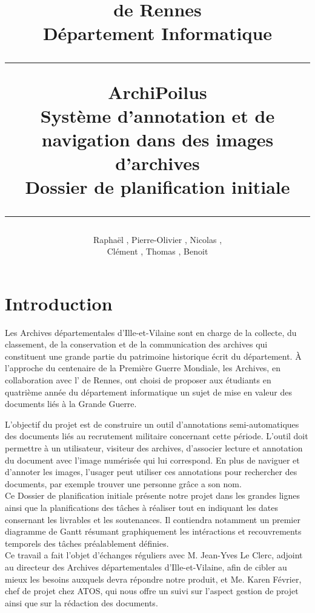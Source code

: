 \documentclass[a4paper]{article}
\title{\bsc{INSA} de Rennes \\ Département Informatique \\ \bigskip \hrule \bigskip ArchiPoilus \\ \bigskip Système d'annotation et de navigation dans des images d'archives \\ \bigskip Dossier de planification initiale \bigskip \hrule}
\author{Raphaël \bsc{Baron}, Pierre-Olivier \bsc{Bouteau}, Nicolas \bsc{Charpentier}, \\ Clément \bsc{Leboullenger}, Thomas \bsc{François}, Benoit \bsc{Travers}}
\begin{document}
\maketitle
\thispagestyle{empty}

\newpage
\tableofcontents
\thispagestyle{empty}

\newpage
{}
{}
\section*{Introduction}

	Les Archives départementales d'Ille-et-Vilaine sont en charge de la collecte, du classement, de la conservation et de la communication des archives qui constituent une grande partie du patrimoine historique écrit du département. 
\`A l'approche du centenaire de la Première Guerre Mondiale, les Archives, en collaboration avec l' de Rennes, ont choisi de proposer aux étudiants en quatrième année du département informatique un sujet de mise en valeur des documents li\'es \`a la Grande Guerre.

	L'objectif du projet est de construire un outil d'annotations semi-auto\-matiques des documents liés au recrutement militaire concernant cette période. L'outil doit permettre à un utilisateur, visiteur des archives, d'associer lecture et annotation du document avec l'image numérisée qui lui correspond. En plus de naviguer et d'annoter les images, l'usager peut utiliser ces annotations pour rechercher des documents, par exemple trouver une personne grâce a son nom.\\
	
	Ce Dossier de planification initiale présente notre projet dans les grandes lignes ainsi que la planifications des tâches à réaliser tout en indiquant les dates consernant les livrables et les soutenances. Il contiendra notamment un premier diagramme de Gantt résumant graphiquement les intéractions et recouvrements temporels des tâches préalablement définies.\\
	
	Ce travail a fait l'objet d'échanges réguliers avec M. Jean-Yves Le Clerc, adjoint au directeur des Archives départementales d’Ille-et-Vilaine, afin de cibler au mieux les besoins auxquels devra répondre notre produit, et Me. Karen Février, chef de projet chez ATOS, qui nous offre un suivi sur l'aspect gestion de projet ainsi que sur la rédaction des documents.

\newpage
\end{document}
